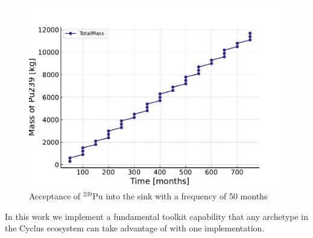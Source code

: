 \begin{figure}[!ht]
    \centering
    \includegraphics[scale=0.8]{images/cyclus/pattern_sink_fuel_transactions.pdf}
    \caption{Acceptance of $^{239}$Pu into the sink with a frequency of 50 months}
    \label{fig:pattern_freq_50}
\end{figure}

In this work we implement a fundamental toolkit capability that any archetype in the Cyclus ecosystem can take advantage of with one implementation.
